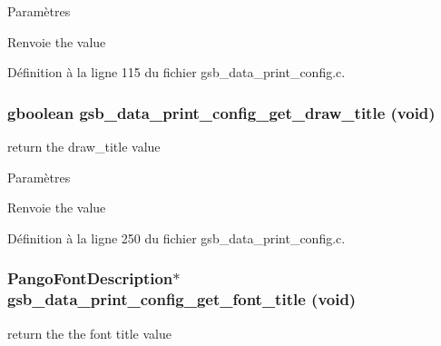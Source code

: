 \begin{DoxyParams}{Paramètres}
\item[{\em }]\end{DoxyParams}
\begin{DoxyReturn}{Renvoie}
the value 
\end{DoxyReturn}


Définition à la ligne 115 du fichier gsb\_\-data\_\-print\_\-config.c.

\subsubsection[{gsb\_\-data\_\-print\_\-config\_\-get\_\-draw\_\-title}]{\setlength{\rightskip}{0pt plus 5cm}gboolean gsb\_\-data\_\-print\_\-config\_\-get\_\-draw\_\-title (void)}\label{gsb__data__print__config_8h_afd8a78e043b717e6bc2a6a18b6ced76d}
return the draw\_\-title value


\begin{DoxyParams}{Paramètres}
\item[{\em }]\end{DoxyParams}
\begin{DoxyReturn}{Renvoie}
the value 
\end{DoxyReturn}


Définition à la ligne 250 du fichier gsb\_\-data\_\-print\_\-config.c.

\subsubsection[{gsb\_\-data\_\-print\_\-config\_\-get\_\-font\_\-title}]{\setlength{\rightskip}{0pt plus 5cm}PangoFontDescription$\ast$ gsb\_\-data\_\-print\_\-config\_\-get\_\-font\_\-title (void)}\label{gsb__data__print__config_8h_a683c317369e1e940e1066cccd3306099}
return the the font title value


